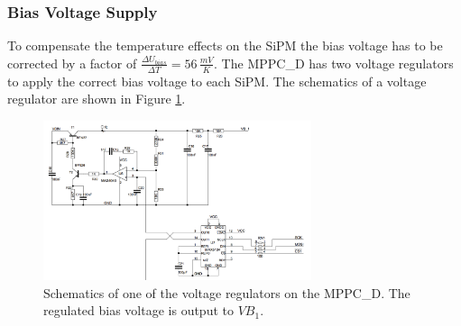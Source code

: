 \documentclass[]{article}
\begin{document}
\newpage

\subsubsection{Bias Voltage Supply}

To compensate the temperature effects on the SiPM the bias voltage has to be corrected by a factor of $\frac{\Delta U_{bias}}{\Delta T} = 56\,\frac{mV}{K}$. The MPPC\_D has two 
voltage regulators to apply the correct bias voltage to each SiPM. The schematics of a voltage regulator are shown in Figure \ref{voltage_regulator}. 
	
	\begin{figure}[t]
		\centering
			\includegraphics[width=0.7\textwidth]{Figures/weinstock/dac_circuit.png}
		\caption{Schematics of one of the voltage regulators on the MPPC\_D. The regulated bias voltage is output to $VB_1$.}
		\label{voltage_regulator}
	\end{figure}	
\end{document}
